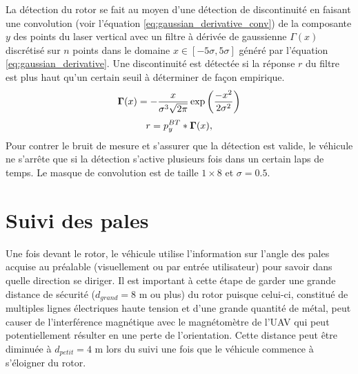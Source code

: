 La détection du rotor se fait au moyen d'une détection de discontinuité en faisant une convolution (voir l'équation \ref{eq:gaussian_derivative_conv}) de la composante $y$ des points du laser vertical avec un filtre à dérivée de gaussienne $\Gamma(x)$ discrétisé sur $n$ points dans le domaine $x \in [-5\sigma,5\sigma]$ généré par l'équation \ref{eq:gaussian_derivative}. Une discontinuité est détectée si la réponse $r$ du filtre est plus haut qu'un certain seuil à déterminer de façon empirique.
\begin{align}
  \mathbf{\Gamma}(x) = - \frac{x}{\sigma^3 \sqrt{2\pi}} \exp\left(\frac{-x^2}{2 \sigma^2}\right)
  \label{eq:gaussian_derivative}
\end{align}
\begin{align}
  r = {p^{BT}_y} * \mathbf{\Gamma}(x),
  \label{eq:gaussian_derivative_conv}
\end{align}
Pour contrer le bruit de mesure et s'assurer que la détection est valide, le véhicule ne s'arrête que si la détection s'active plusieurs fois dans un certain laps de temps.
Le masque de convolution est de taille $1\times8$ et $\sigma = 0.5$.


\section{Suivi des pales}

Une fois devant le rotor, le véhicule utilise l'information sur l'angle des pales acquise au préalable (visuellement ou par entrée utilisateur) pour savoir dans quelle direction se diriger. Il est important à cette étape de garder une grande distance de sécurité ($d_{grand} = 8$ m ou plus) du rotor puisque celui-ci, constitué de multiples lignes électriques haute tension et d'une grande quantité de métal, peut causer de l'interférence magnétique avec le magnétomètre de l'UAV qui peut potentiellement résulter en une perte de l'orientation. Cette distance peut être diminuée à $d_{petit} = 4$ m lors du suivi une fois que le véhicule commence à s'éloigner du rotor.

